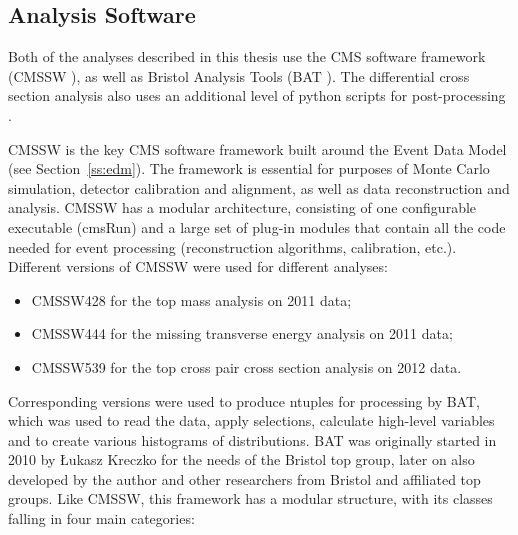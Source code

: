 \subsection{Analysis Software}
\label{ss:analysis_software}
Both of the analyses described in this thesis use the CMS software framework (CMSSW \autocite{CMSSW}), as well as
Bristol Analysis Tools (BAT \autocite{BAT}). The differential cross section analysis also uses an additional level of
python scripts for post-processing \autocite{DailyPythonScripts}.

CMSSW is the key CMS software framework built around the Event Data Model (see Section~\ref{ss:edm}). The framework is
essential for purposes of Monte Carlo simulation, detector calibration and alignment, as well as data reconstruction
and analysis. CMSSW has a modular architecture, consisting of one configurable executable (cmsRun) and a large set of
plug-in modules that contain all the code needed for event processing (reconstruction algorithms, calibration, etc.).
Different versions of CMSSW were used for different analyses: 

\begin{itemize}
  \item CMSSW\underline{\hspace{1ex}}4\underline{\hspace{1ex}}2\underline{\hspace{1ex}}8 for the top mass analysis on 2011 data;
  \item CMSSW\underline{\hspace{1ex}}4\underline{\hspace{1ex}}4\underline{\hspace{1ex}}4 for the missing transverse energy analysis on 2011 data;
  \item CMSSW\underline{\hspace{1ex}}5\underline{\hspace{1ex}}3\underline{\hspace{1ex}}9 for the top cross pair cross section analysis on 2012 data.
\end{itemize}

Corresponding versions were used to produce ntuples for processing by BAT, which was used to read the data, apply
selections, calculate high-level variables and to create various histograms of distributions. BAT was originally started
in 2010 by \L{}ukasz Kreczko for the needs of the Bristol top group, later on also developed by the author and other
researchers from Bristol and affiliated top groups. Like CMSSW, this framework has a modular structure, with its classes
falling in four main categories:

